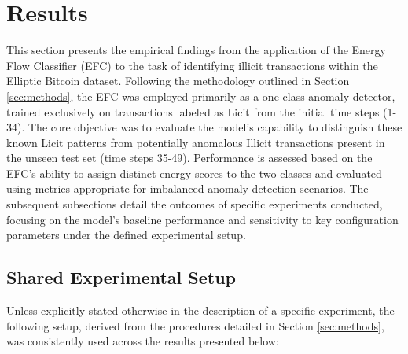 \documentclass[12pt]{article}
\begin{document}
\section{Results} \label{sec:results}
This section presents the empirical findings from the application of the Energy Flow Classifier (EFC) to the task of
identifying illicit transactions within the Elliptic Bitcoin dataset. Following the methodology outlined in Section
\ref{sec:methods}, the EFC was employed primarily as a one-class anomaly detector, trained exclusively on transactions
labeled as Licit from the initial time steps (1-34). The core objective was to evaluate the model's capability to distinguish
these known Licit patterns from potentially anomalous Illicit transactions present in the unseen test set (time steps 35-49).
Performance is assessed based on the EFC's ability to assign distinct energy scores to the two classes and evaluated using
metrics appropriate for imbalanced anomaly detection scenarios. The subsequent subsections detail the outcomes of specific
experiments conducted, focusing on the model's baseline performance and sensitivity to key configuration parameters under
the defined experimental setup.

\subsection{Shared Experimental Setup} \label{subsec:shared_setup}
Unless explicitly stated otherwise in the description of a specific experiment, the following setup, derived from the procedures
detailed in Section \ref{sec:methods}, was consistently used across the results presented below:
\end{document}
